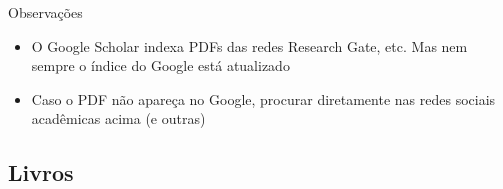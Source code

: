 \documentclass{beamer}
\begin{document}
\begin{frame}{Observações}
  \begin{itemize}
  \item O Google Scholar indexa PDFs das redes Research Gate, etc. Mas
    nem sempre o índice do Google está atualizado
  \item Caso o PDF não apareça no Google, procurar diretamente nas
    redes sociais acadêmicas acima (e outras)
  \end{itemize}
\end{frame}

\subsection{Livros}
\end{document}
